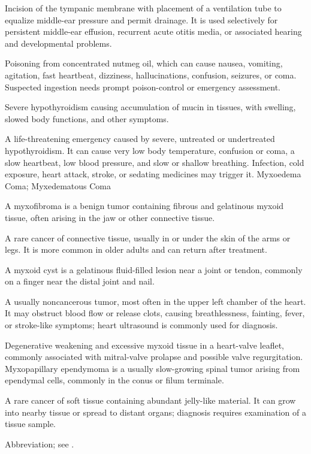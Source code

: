  Incision of the tympanic membrane with placement of a ventilation tube to equalize
middle-ear pressure and permit drainage. It is used selectively for persistent
middle-ear effusion, recurrent acute otitis media, or associated hearing and
developmental problems.

 Poisoning from concentrated nutmeg oil, which can cause nausea, vomiting, agitation, fast heartbeat, dizziness, hallucinations, confusion, seizures, or coma. Suspected ingestion needs prompt poison-control or emergency assessment.

 Severe hypothyroidism causing accumulation of mucin in tissues, with swelling, slowed body functions, and other symptoms.

 A life-threatening emergency caused by severe, untreated or undertreated hypothyroidism. It can cause very low body temperature, confusion or coma, a slow heartbeat, low blood pressure, and slow or shallow breathing. Infection, cold exposure, heart attack, stroke, or sedating medicines may trigger it.
\synonyms
Myxoedema Coma; Myxedematous Coma

 A myxofibroma is a benign tumor containing fibrous and gelatinous myxoid tissue, often arising in the jaw or other connective tissue.

 A rare cancer of connective tissue, usually in or under the skin of the arms or legs. It is more common in older adults and can return after treatment.

 A myxoid cyst is a gelatinous fluid-filled lesion near a joint or tendon, commonly on a finger near the distal joint and nail.

 A usually noncancerous tumor, most often in the upper left chamber of the heart. It may obstruct blood flow or release clots, causing breathlessness, fainting, fever, or stroke-like symptoms; heart ultrasound is commonly used for diagnosis.

 Degenerative weakening and excessive myxoid tissue in a heart-valve leaflet, commonly associated with mitral-valve prolapse and possible valve regurgitation.
 Myxopapillary ependymoma is a usually slow-growing spinal tumor arising from ependymal cells, commonly in the conus or filum terminale.

 A rare cancer of soft tissue containing abundant jelly-like material. It can grow into nearby tissue or spread to distant organs; diagnosis requires examination of a tissue sample.

 Abbreviation; see .
